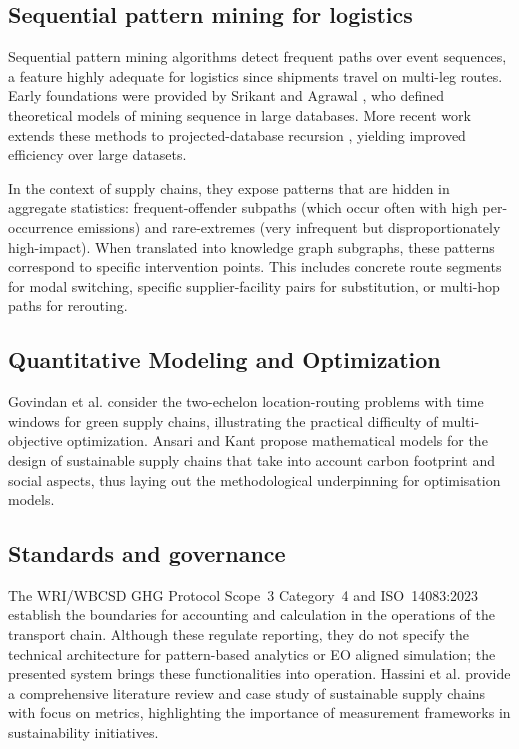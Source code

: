 \documentclass[conference]{IEEEtran}
\begin{document}
\subsection{Sequential pattern mining for logistics}
Sequential pattern mining algorithms detect frequent paths over event sequences, a feature highly adequate for logistics since shipments travel on multi-leg routes. Early foundations were provided by Srikant and Agrawal \cite{us5742811,us5819266}, who defined theoretical models of mining sequence in large databases. More recent work extends these methods to projected-database recursion \cite{lei2019mining}, yielding improved efficiency over large datasets.

In the context of supply chains, they expose patterns that are hidden in aggregate statistics: frequent-offender subpaths (which occur often with high per-occurrence emissions) and rare-extremes (very infrequent but disproportionately high-impact). When translated into knowledge graph subgraphs, these patterns correspond to specific intervention points. This includes concrete route segments for modal switching, specific supplier-facility pairs for substitution, or multi-hop paths for rerouting.

\subsection{Quantitative Modeling and Optimization}
Govindan et al. \cite{govindan2014two} consider the two-echelon location-routing problems with time windows for green supply chains, illustrating the practical difficulty of multi-objective optimization. Ansari and Kant \cite{ansari2014mathematical} propose mathematical models for the design of sustainable supply chains that take into account carbon footprint and social aspects, thus laying out the methodological underpinning for optimisation models.

\subsection{Standards and governance}
The WRI/WBCSD GHG Protocol Scope~3 Category~4 and ISO~14083:2023 \cite{wri2013ghg,iso2023ghg} establish the boundaries for accounting and calculation in the operations of the transport chain. Although these regulate reporting, they do not specify the technical architecture for pattern-based analytics or EO aligned simulation; the presented system brings these functionalities into operation. Hassini et al. \cite{hassini2012literature} provide a comprehensive literature review and case study of sustainable supply chains with focus on metrics, highlighting the importance of measurement frameworks in sustainability initiatives.
\end{document}
